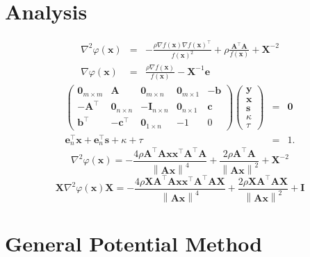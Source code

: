 \documentclass{article}
\newcommand{\x}{\mathbf{x}}
\newcommand{\A}{\mathbf{A}}
\newcommand{\0}{\textbf{0}}
\newcommand{\e}{\mathbf{e}}
\newcommand{\n}{\nabla}
\newcommand{\X}{\mathbf{X}}
\newcommand{\I}{\mathbf{I}}
\newcommand{\tmb}{\mathbf{b}}
\newcommand{\tmc}{\mathbf{c}}
\newcommand{\y}{\mathbf{y}}
\newcommand{\s}{\mathbf{s}}
\begin{document}
\

\section{Analysis}

\begin{eqnarray*}
  \nabla^2 \varphi \left( \x \right) & = & - \frac{\rho \n f \left( \x \right)
  \n f \left( \x \right)^{\top}}{f \left( \x \right)^2} + \rho \frac{\A^{\top}
  \A}{f \left( \x \right)} + \X^{- 2}\\
  \n \varphi \left( \x \right) & = & \frac{\rho \n f \left( \x \right)}{f
  \left( \x \right)} - \X^{- 1} \e
\end{eqnarray*}
\begin{eqnarray*}
  \left(\begin{array}{ccccc}
    \0_{m \times m} & \A & \0_{m \times n} & \0_{m \times 1} & - \tmb\\
    - \A^{\top} & \0_{n \times n} & - \I_{n \times n} & \0_{n \times 1} &
    \tmc\\
    \tmb^{\top} & - \tmc^{\top} & \0_{1 \times n} & - 1 & 0
  \end{array}\right) \left(\begin{array}{c}
    \y\\
    \x\\
    \s\\
    \kappa\\
    \tau
  \end{array}\right) & = & \0\\
  \e_n^{\top} \x + \e_n^{\top} \s + \kappa + \tau & = & 1.
\end{eqnarray*}
\[ \nabla^2 \varphi \left( \x \right) = - \frac{4 \rho \A^{\top} \A \x
   \x^{\top} \A^{\top} \A}{\left\| \A \x \right\|^4} + \frac{2 \rho \A^{\top}
   \A}{\left\| \A \x \right\|^2} + \X^{- 2} \]
\[ \X \n^2 \varphi \left( \x \right) \X = - \frac{4 \rho \X \A^{\top} \A \x
   \x^{\top} \A^{\top} \A \X}{\left\| \A \x \right\|^4} + \frac{2 \rho \X
   \A^{\top} \A \X}{\left\| \A \x \right\|^2} + \I \]


\section{General Potential Method}
\end{document}
